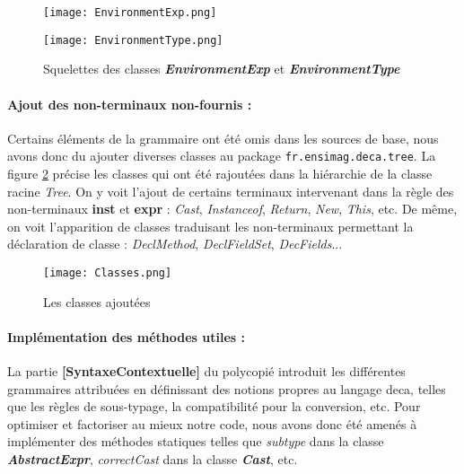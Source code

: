 \documentclass{article}
\begin{document}
    \begin{figure}[h]
    \centering
      \begin{minipage}[h]{.43\linewidth}
        \texttt{[image: EnvironmentExp.png]}
      \end{minipage} \hfill
      \begin{minipage}[h]{.44\linewidth}
        \texttt{[image: EnvironmentType.png]}
      \end{minipage}
      \caption{Squelettes des classes \textbf{\textit{EnvironmentExp}} et \textbf{\textit{EnvironmentType}}}
      \label{Env}
    \end{figure}

\newpage

    \paragraph{Ajout des non-terminaux non-fournis :}
     Certains éléments de la grammaire ont été omis dans les sources de base, nous avons donc du ajouter diverses classes au package \texttt{fr.ensimag.deca.tree}.
     La figure \ref{classes} précise les classes qui ont été rajoutées dans la hiérarchie de la classe racine \textit{Tree}.
     On y voit l'ajout de certains terminaux intervenant dans la règle des non-terminaux \textbf{inst} et \textbf{expr} : \textit{Cast}, \textit{Instanceof}, \textit{Return}, \textit{New}, \textit{This}, etc. De même, on voit l'apparition de classes traduisant les non-terminaux permettant la déclaration de classe : \textit{DeclMethod}, \textit{DeclFieldSet}, \textit{DecFields}...

    \begin{figure}
        \centering
        \texttt{[image: Classes.png]}
        \caption{Les classes ajoutées}
        \label{classes}
    \end{figure}
    
    \paragraph{Implémentation des méthodes utiles :}
    La partie \textbf{[SyntaxeContextuelle]} du polycopié introduit les différentes grammaires attribuées en définissant des notions propres au langage deca, telles que les règles de sous-typage, la compatibilité pour la conversion, etc.
    Pour optimiser et factoriser au mieux notre code, nous avons donc été amenés à implémenter des méthodes statiques telles que \textit{subtype} dans la classe \textbf{\textit{AbstractExpr}}, \textit{correctCast} dans la classe \textbf{\textit{Cast}}, etc.
    
\end{document}

